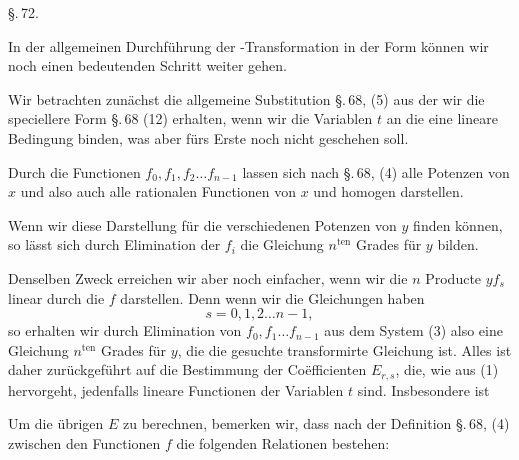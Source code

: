 
\begin{center}
\S.\,72.
\end{center}

\begin{center}
\end{center}

In der allgemeinen Durchführung der -Transformation in der  Form können wir noch einen bedeutenden Schritt weiter gehen.

Wir betrachten zunächst die allgemeine Substitution \S.\,68, (5)
aus der wir die speciellere Form \S.\,68 (12) erhalten, wenn wir die Variablen $t$ an die eine lineare Bedingung
binden, was aber fürs Erste noch nicht geschehen soll.

Durch die Functionen $f_0, f_1, f_2 \ldots f_{n-1}$ lassen sich nach \S.\,68, (4) alle Potenzen von $x$ und also auch alle rationalen Functionen von $x$  und homogen darstellen.

Wenn wir diese Darstellung für die verschiedenen Potenzen von $y$ finden können, so lässt sich durch Elimination der $f_i$ die Gleichung $n^{\text{ten}}$ Grades für $y$ bilden.

Denselben Zweck erreichen wir aber noch einfacher, wenn wir die $n$ Producte $y f_s$ linear durch die $f$ darstellen. Denn wenn wir die Gleichungen haben
\[
s = 0, 1, 2 \ldots n-1,
\]
so erhalten wir durch Elimination von $f_0, f_1 \ldots f_{n-1}$ aus dem System (3)
also eine Gleichung $n^{\text{ten}}$ Grades für $y$, die die gesuchte transformirte Gleichung ist. Alles ist daher zurückgeführt auf die Bestimmung der Co\"efficienten $E_{r,s}$, die, wie aus (1) hervorgeht, jedenfalls lineare Functionen der Variablen $t$ sind. Insbesondere ist

Um die übrigen $E$ zu berechnen, bemerken wir, dass nach der Definition \S.\,68, (4) zwischen den Functionen $f$ die folgenden Relationen bestehen:
